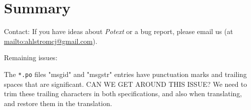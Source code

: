 \documentclass[
 11pt,
 twoside,
 a4paper,
 final                                 %
]{article}
\begin{document}





\section{Summary}
\label{sec:summary}

   Contact: If you have ideas about \textsl{Potext} or a bug report,
   please email us (at \url{mailto:ahlstromcj@gmail.com}).

   Remaining issues:

   The \texttt{*.po} files "msgid" and "msgstr" entries have punctuation marks
   and trailing spaces that are significant.
   CAN WE GET AROUND THIS ISSUE?
   We need to trim these trailing characters in both specifications,
   and also when translating, and restore them in the translation.




\printindex
\end{document}
